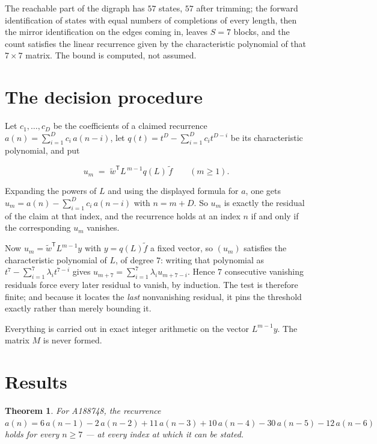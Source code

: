 \documentclass[11pt]{article}
\newtheorem{theorem}{Theorem}
\theoremstyle{definition}
\begin{document}
The reachable part of the digraph has $57$ states, $57$ after trimming; the forward identification of states with equal numbers of completions of every length, then the mirror identification on the edges coming in, leaves $S = 7$ blocks, and the count satisfies the linear recurrence given by the characteristic polynomial of that $7\times7$ matrix. The bound is computed, not assumed.

\section{The decision procedure}

Let $c_1,\dots,c_D$ be the coefficients of a claimed recurrence $a(n) = \sum_{i=1}^{D} c_i\,a(n-i)$, let $q(t) = t^{D} - \sum_{i=1}^{D} c_i t^{D-i}$ be its characteristic polynomial, and put

\[u_m \;=\; \tilde w^{\mathsf T} L^{\,m-1} q(L)\,\tilde f \qquad (m \ge 1).\]

Expanding the powers of $L$ and using the displayed formula for $a$, one gets $u_m = a(n) - \sum_{i=1}^{D} c_i\,a(n-i)$ with $n = m + D$. So $u_m$ is exactly the residual of the claim at that index, and the recurrence holds at an index $n$ if and only if the corresponding $u_m$ vanishes.

Now $u_m = \tilde w^{\mathsf T} L^{m-1} y$ with $y = q(L)\tilde f$ a fixed vector, so $(u_m)$ satisfies the characteristic polynomial of $L$, of degree $7$: writing that polynomial as $t^{7} - \sum_{i=1}^{7} \lambda_i t^{7-i}$ gives $u_{m+7} = \sum_{i=1}^{7} \lambda_i u_{m+7-i}$. Hence $7$ consecutive vanishing residuals force every later residual to vanish, by induction. The test is therefore finite; and because it locates the {\itshape last} nonvanishing residual, it pins the threshold exactly rather than merely bounding it.

Everything is carried out in exact integer arithmetic on the vector $L^{m-1}y$. The matrix $M$ is never formed.

\section{Results}

\begin{theorem} For A188748, the recurrence $a(n) = 6\,a(n-1) - 2\,a(n-2) + 11\,a(n-3) + 10\,a(n-4) - 30\,a(n-5) - 12\,a(n-6)$ holds for every $n \ge 7$ --- at every index at which it can be stated.\end{theorem}
\end{document}
